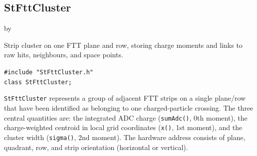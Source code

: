 \documentclass[twoside]{article}
\newcommand{\entrylabel}[1]{\mbox{\textbf{{#1}}}\hfil}%
\newenvironment{entry}
{\begin{list}{}%
    {\renewcommand{\makelabel}{\entrylabel}%
     \setlength{\labelwidth}{90pt}%
     \setlength{\leftmargin}{\labelwidth}
     \advance\leftmargin by \labelsep%
      }%
    }%
  {\end{list}}
\newcommand{\Entrylabel}[1]%
{\raisebox{0pt}[1ex][0pt]{\makebox[\labelwidth][l]%
    {\parbox[t]{\labelwidth}{\hspace{0pt}\textbf{{#1}}}}}}
\newenvironment{Entry}%
{\renewcommand{\entrylabel}{\Entrylabel}\begin{entry}}%
  {\end{entry}}
\begin{document}
\subsection{StFttCluster}
\label{sec:StFttCluster}
\begin{Entry}
\item[Summary] Strip cluster on one FTT plane and row, storing charge moments and links
  to raw hits, neighbours, and space points.
\item[Synopsis]
    \verb+#include "StFttCluster.h"+\\
    \verb+class StFttCluster;+\\
\item[Description]
  \texttt{StFttCluster} represents a group of adjacent FTT strips on a single plane/row
  that have been identified as belonging to one charged-particle crossing.  The three
  central quantities are: the integrated ADC charge (\texttt{sumAdc()}, 0th moment), the
  charge-weighted centroid in local grid coordinates (\texttt{x()}, 1st moment), and the
  cluster width (\texttt{sigma()}, 2nd moment).  The hardware address consists of plane,
  quadrant, row, and strip orientation (horizontal or vertical).


\end{Entry}
\end{document}
